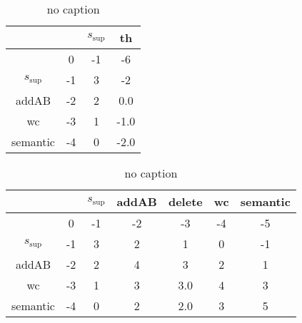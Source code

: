 \documentclass[12pt]{article}
\begin{document}
\begin{table}
\begin{center}
\begin{tabular}{c | c c c }
 & & $s_\text{sup}$ & th\\
\hline
 & 0 & -1 & -6\\
$s_\text{sup}$ & -1 & 3 & -2\\
addAB & -2 & 2 & 0.0\\
wc & -3 & 1 & -1.0\\
semantic & -4 & 0 & -2.0
\end{tabular}
\caption{no caption}
\label{tbl:needsAName}
\end{center}
\end{table}



\begin{table}
\begin{center}
\begin{tabular}{c | c c c c c c }
 & & $s_\text{sup}$ & addAB & delete & wc & semantic\\
\hline
 & 0 & -1 & -2 & -3 & -4 & -5\\
$s_\text{sup}$ & -1 & 3 & 2 & 1 & 0 & -1\\
addAB & -2 & 2 & 4 & 3 & 2 & 1\\
wc & -3 & 1 & 3 & 3.0 & 4 & 3\\
semantic & -4 & 0 & 2 & 2.0 & 3 & 5
\end{tabular}
\caption{no caption}
\label{tbl:needsAName}
\end{center}
\end{table}
\end{document}
